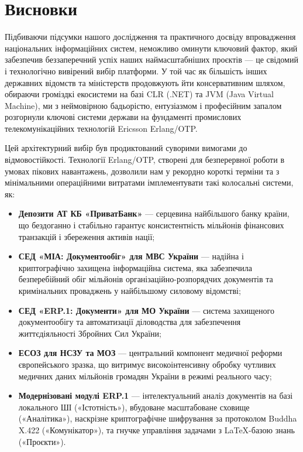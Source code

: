 \chapter{Висновки}

Підбиваючи підсумки нашого дослідження та практичного досвіду впровадження національних інформаційних систем, неможливо оминути ключовий фактор, який забезпечив беззаперечний успіх наших наймасштабніших проєктів — це свідомий і технологічно вивірений вибір платформи. У той час як більшість інших державних відомств та міністерств продовжують йти консервативним шляхом, обираючи громіздкі екосистеми на базі CLR (.NET) та JVM (Java Virtual Machine), ми з неймовірною бадьорістю, ентузіазмом і професійним запалом розгорнули ключові системи держави на фундаменті промислових телекомунікаційних технологій Ericsson Erlang/OTP.

Цей архітектурний вибір був продиктований суворими вимогами до відмовостійкості. Технології Erlang/OTP, створені для безперервної роботи в умовах пікових навантажень, дозволили нам у рекордно короткі терміни та з мінімальними операційними витратами імплементувати такі колосальні системи, як:
\begin{itemize}
    \item \textbf{Депозити АТ КБ «ПриватБанк»} — серцевина найбільшого банку країни, що бездоганно і стабільно гарантує консистентність мільйонів фінансових транзакцій і збереження активів нації;
    \item \textbf{СЕД «МІА: Документообіг» для МВС України} — надійна і криптографічно захищена інформаційна система, яка забезпечила безперебійний обіг мільйонів організаційно-розпорядчих документів та кримінальних проваджень у найбільшому силовому відомстві;
    \item \textbf{СЕД «ERP.1: Документи» для МО України} — система захищеного документообігу та автоматизації діловодства для забезпечення життєдіяльності Збройних Сил України;
    \item \textbf{ЕСОЗ для НСЗУ та МОЗ} — центральний компонент медичної реформи європейського зразка, що витримує високоінтенсивну обробку чутливих медичних даних мільйонів громадян України в режимі реального часу;
    \item \textbf{Модернізовані модулі ERP.1} — інтелектуальний аналіз документів на базі локального ШІ («Істотність»), вбудоване масштабоване сховище («Аналітика»), наскрізне криптографічне шифрування за протоколом Buddha X.422 («Комунікатор»), та гнучке управління задачами з LaTeX-базою знань («Проєкти»).
\end{itemize}

